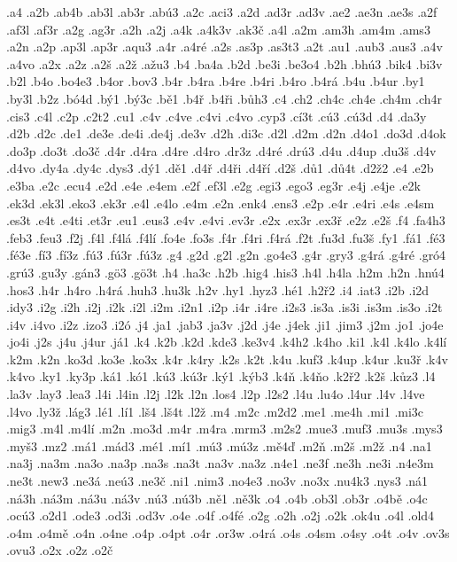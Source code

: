 .a4
.a2b
.ab4b
.ab3l
.ab3r
.abú3
.a2c
.aci3
.a2d
.ad3r
.ad3v
.ae2
.ae3n
.ae3s
.a2f
.af3l
.af3r
.a2g
.ag3r
.a2h
.a2j
.a4k
.a4k3v
.ak3č
.a4l
.a2m
.am3h
.am4m
.ams3
.a2n
.a2p
.ap3l
.ap3r
.aqu3
.a4r
.a4ré
.a2s
.as3p
.as3t3
.a2t
.au1
.aub3
.aus3
.a4v
.a4vo
.a2x
.a2z
.a2š
.a2ž
.ažu3
.b4
.ba4a
.b2d
.be3i
.be3o4
.b2h
.bhú3
.bik4
.bi3v
.b2l
.b4o
.bo4e3
.b4or
.bov3
.b4r
.b4ra
.b4re
.b4ri
.b4ro
.b4rá
.b4u
.b4ur
.by1
.by3l
.b2z
.bó4d
.bý1
.bý3c
.bě1
.b4ř
.b4ři
.bůh3
.c4
.ch2
.ch4c
.ch4e
.ch4m
.ch4r
.cis3
.c4l
.c2p
.c2t2
.cu1
.c4v
.c4ve
.c4vi
.c4vo
.cyp3
.cí3t
.cú3
.cú3d
.d4
.da3y
.d2b
.d2c
.de1
.de3e
.de4i
.de4j
.de3v
.d2h
.di3c
.d2l
.d2m
.d2n
.d4o1
.do3d
.d4ok
.do3p
.do3t
.do3č
.d4r
.d4ra
.d4re
.d4ro
.dr3z
.d4ré
.drú3
.d4u
.d4up
.du3š
.d4v
.d4vo
.dy4a
.dy4c
.dys3
.dý1
.dě1
.d4ř
.d4ři
.d4ří
.d2š
.dů1
.dů4t
.d2ž2
.e4
.e2b
.e3ba
.e2c
.ecu4
.e2d
.e4e
.e4em
.e2f
.ef3l
.e2g
.egi3
.ego3
.eg3r
.e4j
.e4je
.e2k
.ek3d
.ek3l
.eko3
.ek3r
.e4l
.e4lo
.e4m
.e2n
.enk4
.ens3
.e2p
.e4r
.e4ri
.e4s
.e4sm
.es3t
.e4t
.e4ti
.et3r
.eu1
.eus3
.e4v
.e4vi
.ev3r
.e2x
.ex3r
.ex3ř
.e2z
.e2š
.f4
.fa4h3
.feb3
.feu3
.f2j
.f4l
.f4lá
.f4lí
.fo4e
.fo3s
.f4r
.f4ri
.f4rá
.f2t
.fu3d
.fu3š
.fy1
.fá1
.fé3
.fé3e
.fí3
.fí3z
.fú3
.fú3r
.fú3z
.g4
.g2d
.g2l
.g2n
.go4e3
.g4r
.gry3
.g4rá
.g4ré
.gró4
.grú3
.gu3y
.gán3
.gö3
.gö3t
.h4
.ha3c
.h2b
.hig4
.his3
.h4l
.h4la
.h2m
.h2n
.hnú4
.hos3
.h4r
.h4ro
.h4rá
.huh3
.hu3k
.h2v
.hy1
.hyz3
.hé1
.h2ř2
.i4
.iat3
.i2b
.i2d
.idy3
.i2g
.i2h
.i2j
.i2k
.i2l
.i2m
.i2n1
.i2p
.i4r
.i4re
.i2s3
.is3a
.is3i
.is3m
.is3o
.i2t
.i4v
.i4vo
.i2z
.izo3
.i2ó
.j4
.ja1
.jab3
.ja3v
.j2d
.j4e
.j4ek
.ji1
.jim3
.j2m
.jo1
.jo4e
.jo4i
.j2s
.j4u
.j4ur
.já1
.k4
.k2b
.k2d
.kde3
.ke3v4
.k4h2
.k4ho
.ki1
.k4l
.k4lo
.k4lí
.k2m
.k2n
.ko3d
.ko3e
.ko3x
.k4r
.k4ry
.k2s
.k2t
.k4u
.kuf3
.k4up
.k4ur
.ku3ř
.k4v
.k4vo
.ky1
.ky3p
.ká1
.kó1
.kú3
.kú3r
.ký1
.kýb3
.k4ň
.k4ňo
.k2ř2
.k2š
.kůz3
.l4
.la3v
.lay3
.lea3
.l4i
.l4in
.l2j
.l2k
.l2n
.los4
.l2p
.l2s2
.l4u
.lu4o
.l4ur
.l4v
.l4ve
.l4vo
.ly3ž
.lág3
.lé1
.lí1
.lš4
.lš4t
.l2ž
.m4
.m2c
.m2d2
.me1
.me4h
.mi1
.mi3c
.mig3
.m4l
.m4lí
.m2n
.mo3d
.m4r
.m4ra
.mrm3
.m2s2
.mue3
.muf3
.mu3s
.mys3
.myš3
.mz2
.má1
.mád3
.mé1
.mí1
.mú3
.mú3z
.mě4ď
.m2ň
.m2š
.m2ž
.n4
.na1
.na3j
.na3m
.na3o
.na3p
.na3s
.na3t
.na3v
.na3z
.n4e1
.ne3f
.ne3h
.ne3i
.n4e3m
.ne3t
.new3
.ne3á
.neú3
.ne3č
.ni1
.nim3
.no4e3
.no3v
.no3x
.nu4k3
.nys3
.ná1
.ná3h
.ná3m
.ná3u
.ná3v
.nú3
.nú3b
.ně1
.ně3k
.o4
.o4b
.ob3l
.ob3r
.o4bě
.o4c
.ocú3
.o2d1
.ode3
.od3i
.od3v
.o4e
.o4f
.o4fé
.o2g
.o2h
.o2j
.o2k
.ok4u
.o4l
.old4
.o4m
.o4mě
.o4n
.o4ne
.o4p
.o4pt
.o4r
.or3w
.o4rá
.o4s
.o4sm
.o4sy
.o4t
.o4v
.ov3s
.ovu3
.o2x
.o2z
.o2č
